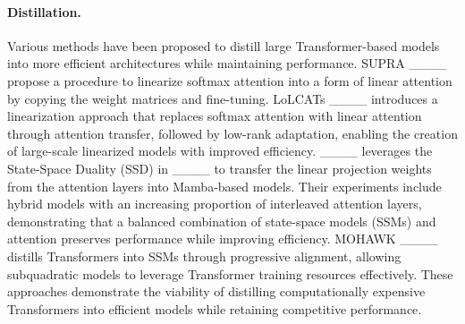 \paragraph{Distillation.}
Various methods have been proposed to distill large Transformer-based models into more efficient architectures while maintaining performance.
SUPRA ____ propose a procedure to linearize softmax attention into a form of linear attention by copying the weight matrices and fine-tuning.
LoLCATs ____ introduces a linearization approach that replaces softmax attention with linear attention through attention transfer, followed by low-rank adaptation, enabling the creation of large-scale linearized models with improved efficiency. 
____ leverages the State-Space Duality (SSD) in ____ to transfer the linear projection weights from the attention layers into Mamba-based models. Their experiments include hybrid models with an increasing proportion of interleaved attention layers, demonstrating that a balanced combination of state-space models (SSMs) and attention preserves performance while improving efficiency.
MOHAWK ____ distills Transformers into SSMs through progressive alignment, allowing subquadratic models to leverage Transformer training resources effectively. These approaches demonstrate the viability of distilling computationally expensive Transformers into efficient models while retaining competitive performance.